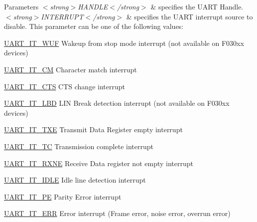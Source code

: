 \begin{DoxyParams}{Parameters}
{\em $<$strong$>$\+H\+A\+N\+D\+L\+E$<$/strong$>$} & specifies the U\+A\+RT Handle. \\
\hline
{\em $<$strong$>$\+I\+N\+T\+E\+R\+R\+U\+P\+T$<$/strong$>$} & specifies the U\+A\+RT interrupt source to disable. This parameter can be one of the following values\+: \begin{DoxyItemize}
\item \hyperlink{group___u_a_r_t___interrupt__definition_gab8899f6307781779f65a7c18aabb3204}{U\+A\+R\+T\+\_\+\+I\+T\+\_\+\+W\+UF} Wakeup from stop mode interrupt (not available on F030xx devices) \item \hyperlink{group___u_a_r_t___interrupt__definition_ga4c22e866bce68975a180828012489106}{U\+A\+R\+T\+\_\+\+I\+T\+\_\+\+CM} Character match interrupt \item \hyperlink{group___u_a_r_t___interrupt__definition_ga986d271478550f9afa918262ca642333}{U\+A\+R\+T\+\_\+\+I\+T\+\_\+\+C\+TS} C\+TS change interrupt \item \hyperlink{group___u_a_r_t___interrupt__definition_gabca5e77508dc2dd9aa26fcb683d9b988}{U\+A\+R\+T\+\_\+\+I\+T\+\_\+\+L\+BD} L\+IN Break detection interrupt (not available on F030xx devices) \item \hyperlink{group___u_a_r_t___interrupt__definition_ga552636e2af516d578856f5ee2ba71ed7}{U\+A\+R\+T\+\_\+\+I\+T\+\_\+\+T\+XE} Transmit Data Register empty interrupt \item \hyperlink{group___u_a_r_t___interrupt__definition_gab9a4dc4e8cea354fd60f4117513b2004}{U\+A\+R\+T\+\_\+\+I\+T\+\_\+\+TC} Transmission complete interrupt \item \hyperlink{group___u_a_r_t___interrupt__definition_gac1bedf7a65eb8c3f3c4b52bdb24b139d}{U\+A\+R\+T\+\_\+\+I\+T\+\_\+\+R\+X\+NE} Receive Data register not empty interrupt \item \hyperlink{group___u_a_r_t___interrupt__definition_ga9781808d4f9999061fc2da36572191d9}{U\+A\+R\+T\+\_\+\+I\+T\+\_\+\+I\+D\+LE} Idle line detection interrupt \item \hyperlink{group___u_a_r_t___interrupt__definition_ga55f922ddcf513509710ade5d7c40a1db}{U\+A\+R\+T\+\_\+\+I\+T\+\_\+\+PE} Parity Error interrupt \item \hyperlink{group___u_a_r_t___i_t_ga8eb26d8edd9bf78ae8d3ad87dd51b618}{U\+A\+R\+T\+\_\+\+I\+T\+\_\+\+E\+RR} Error interrupt (Frame error, noise error, overrun error) \end{DoxyItemize}
\\
\hline
\end{DoxyParams}

